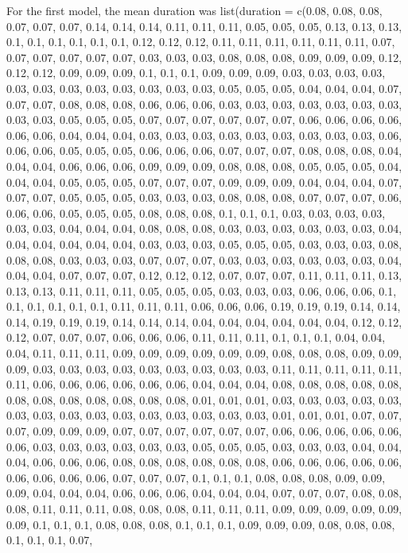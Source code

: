 \documentclass[
  ,man]{apa6}
\begin{document}
For the first model, the mean duration was list(duration = c(0.08, 0.08, 0.08, 0.07, 0.07, 0.07, 0.14, 0.14, 0.14, 0.11, 0.11, 0.11, 0.05, 0.05, 0.05, 0.13, 0.13, 0.13, 0.1, 0.1, 0.1, 0.1, 0.1, 0.1, 0.12, 0.12, 0.12, 0.11, 0.11, 0.11, 0.11, 0.11, 0.11, 0.07, 0.07, 0.07, 0.07, 0.07, 0.07, 0.03, 0.03, 0.03, 0.08, 0.08, 0.08, 0.09, 0.09, 0.09, 0.12, 0.12, 0.12, 0.09, 0.09, 0.09, 0.1, 0.1, 0.1, 0.09, 0.09, 0.09, 0.03, 0.03, 0.03, 0.03, 0.03, 0.03, 0.03, 0.03, 0.03, 0.03, 0.03, 0.03, 0.05, 0.05, 0.05, 0.04, 0.04, 0.04, 0.07, 0.07, 0.07, 0.08,
0.08, 0.08, 0.06, 0.06, 0.06, 0.03, 0.03, 0.03, 0.03, 0.03, 0.03, 0.03, 0.03, 0.03, 0.05, 0.05, 0.05, 0.07, 0.07, 0.07, 0.07, 0.07, 0.07, 0.06, 0.06, 0.06, 0.06, 0.06, 0.06, 0.04, 0.04, 0.04, 0.03, 0.03, 0.03, 0.03, 0.03, 0.03, 0.03, 0.03, 0.03, 0.06, 0.06, 0.06, 0.05, 0.05, 0.05, 0.06, 0.06, 0.06, 0.07, 0.07, 0.07, 0.08, 0.08, 0.08, 0.04, 0.04, 0.04, 0.06, 0.06, 0.06, 0.09, 0.09, 0.09, 0.08, 0.08, 0.08, 0.05, 0.05, 0.05, 0.04, 0.04, 0.04, 0.05, 0.05, 0.05, 0.07, 0.07, 0.07, 0.09, 0.09, 0.09, 0.04,
0.04, 0.04, 0.07, 0.07, 0.07, 0.05, 0.05, 0.05, 0.03, 0.03, 0.03, 0.08, 0.08, 0.08, 0.07, 0.07, 0.07, 0.06, 0.06, 0.06, 0.05, 0.05, 0.05, 0.08, 0.08, 0.08, 0.1, 0.1, 0.1, 0.03, 0.03, 0.03, 0.03, 0.03, 0.03, 0.04, 0.04, 0.04, 0.08, 0.08, 0.08, 0.03, 0.03, 0.03, 0.03, 0.03, 0.03, 0.04, 0.04, 0.04, 0.04, 0.04, 0.04, 0.03, 0.03, 0.03, 0.05, 0.05, 0.05, 0.03, 0.03, 0.03, 0.08, 0.08, 0.08, 0.03, 0.03, 0.03, 0.07, 0.07, 0.07, 0.03, 0.03, 0.03, 0.03, 0.03, 0.03, 0.04, 0.04, 0.04, 0.07, 0.07, 0.07, 0.12,
0.12, 0.12, 0.07, 0.07, 0.07, 0.11, 0.11, 0.11, 0.13, 0.13, 0.13, 0.11, 0.11, 0.11, 0.05, 0.05, 0.05, 0.03, 0.03, 0.03, 0.06, 0.06, 0.06, 0.1, 0.1, 0.1, 0.1, 0.1, 0.1, 0.11, 0.11, 0.11, 0.06, 0.06, 0.06, 0.19, 0.19, 0.19, 0.14, 0.14, 0.14, 0.19, 0.19, 0.19, 0.14, 0.14, 0.14, 0.04, 0.04, 0.04, 0.04, 0.04, 0.04, 0.12, 0.12, 0.12, 0.07, 0.07, 0.07, 0.06, 0.06, 0.06, 0.11, 0.11, 0.11, 0.1, 0.1, 0.1, 0.04, 0.04, 0.04, 0.11, 0.11, 0.11, 0.09, 0.09, 0.09, 0.09, 0.09, 0.09, 0.08, 0.08, 0.08, 0.09, 0.09,
0.09, 0.03, 0.03, 0.03, 0.03, 0.03, 0.03, 0.03, 0.03, 0.03, 0.11, 0.11, 0.11, 0.11, 0.11, 0.11, 0.06, 0.06, 0.06, 0.06, 0.06, 0.06, 0.04, 0.04, 0.04, 0.08, 0.08, 0.08, 0.08, 0.08, 0.08, 0.08, 0.08, 0.08, 0.08, 0.08, 0.08, 0.01, 0.01, 0.01, 0.03, 0.03, 0.03, 0.03, 0.03, 0.03, 0.03, 0.03, 0.03, 0.03, 0.03, 0.03, 0.03, 0.03, 0.03, 0.01, 0.01, 0.01, 0.07, 0.07, 0.07, 0.09, 0.09, 0.09, 0.07, 0.07, 0.07, 0.07, 0.07, 0.07, 0.06, 0.06, 0.06, 0.06, 0.06, 0.06, 0.03, 0.03, 0.03, 0.03, 0.03, 0.03, 0.05, 0.05,
0.05, 0.03, 0.03, 0.03, 0.04, 0.04, 0.04, 0.06, 0.06, 0.06, 0.08, 0.08, 0.08, 0.08, 0.08, 0.08, 0.06, 0.06, 0.06, 0.06, 0.06, 0.06, 0.06, 0.06, 0.06, 0.07, 0.07, 0.07, 0.1, 0.1, 0.1, 0.08, 0.08, 0.08, 0.09, 0.09, 0.09, 0.04, 0.04, 0.04, 0.06, 0.06, 0.06, 0.04, 0.04, 0.04, 0.07, 0.07, 0.07, 0.08, 0.08, 0.08, 0.11, 0.11, 0.11, 0.08, 0.08, 0.08, 0.11, 0.11, 0.11, 0.09, 0.09, 0.09, 0.09, 0.09, 0.09, 0.1, 0.1, 0.1, 0.08, 0.08, 0.08, 0.1, 0.1, 0.1, 0.09, 0.09, 0.09, 0.08, 0.08, 0.08, 0.1, 0.1, 0.1, 0.07,
\end{document}
